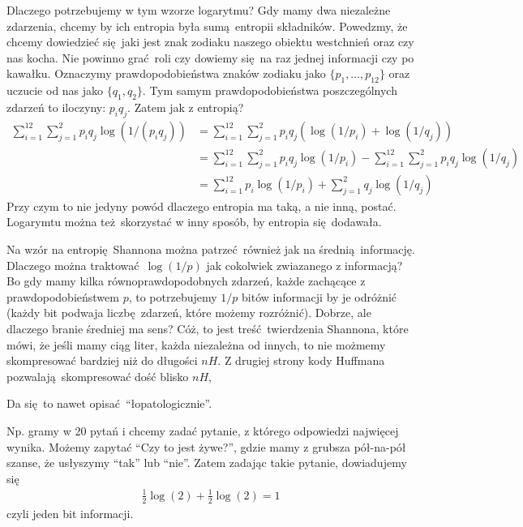 \documentclass[10pt,a4paper]{article}
\begin{document}
Dlaczego potrzebujemy w tym wzorze logarytmu? 
Gdy mamy dwa niezależne zdarzenia, chcemy by ich entropia była sumą entropii składników.
%
%
Powedzmy, że chcemy dowiedzieć się jaki jest znak zodiaku naszego obiektu westchnień oraz czy nas kocha. Nie powinno grać roli czy dowiemy się na raz jednej informacji czy po kawałku.
Oznaczymy prawdopodobieństwa znaków zodiaku jako $\{p_1, \ldots, p_{12} \}$ oraz uczucie od nas jako $\{q_1, q_2\}$. Tym samym prawdopodobieństwa poszczególnych zdarzeń to iloczyny: $p_i q_j$. Zatem jak z entropią?
%
\begin{align}
    \sum_{i=1}^{12} \sum_{j=1}^2 p_i q_j \log(1/(p_i q_j))
    &= \sum_{i=1}^{12} \sum_{j=1}^2 p_i q_j \left( \log(1/p_i) + \log(1/q_j) \right)\\
    &= \sum_{i=1}^{12} \sum_{j=1}^2 p_i q_j \log(1/p_i)
    -\sum_{i=1}^{12} \sum_{j=1}^2 p_i q_j \log(1/q_j)\\
    &= \sum_{i=1}^{12} p_i \log(1/p_i)
    + \sum_{j=1}^2 q_j \log(1/q_j)
\end{align}
%
Przy czym to nie jedyny powód dlaczego entropia ma taką, a nie inną, postać. Logarymtu można też skorzystać w inny sposób, by entropia się dodawała.

Na wzór na entropię Shannona można patrzeć również jak na średnią informację. Dlaczego można traktować $\log(1/p)$ jak cokolwiek zwiazanego z informacją? Bo gdy mamy kilka równoprawdopodobnych zdarzeń, każde zachącące z prawdopodobieństwem $p$, to potrzebujemy $1/p$ bitów informacji by je odróżnić (każdy bit podwaja liczbę zdarzeń, które możemy rozróżnić). Dobrze, ale dlaczego branie średniej ma sens? Cóż, to jest treść twierdzenia Shannona, które mówi, że jeśli mamy ciąg liter, każda niezależna od innych, to nie możmemy skompresować bardziej niż do długości $n H$. Z drugiej strony kody Huffmana pozwalają skompresować dość blisko $n H$,

Da się to nawet opisać ``łopatologicznie''.


Np. gramy w 20 pytań i chcemy zadać pytanie, z którego odpowiedzi najwięcej wynika. Możemy zapytać ``Czy to jest żywe?'', gdzie mamy z grubsza pół-na-pół szanse, że usłyszymy ``tak'' lub ``nie''.  Zatem zadając takie pytanie, dowiadujemy się
\begin{align}
    \tfrac{1}{2} \log(2) + \tfrac{1}{2} \log(2)  = 1
\end{align}
czyli jeden bit informacji. 
\end{document}
